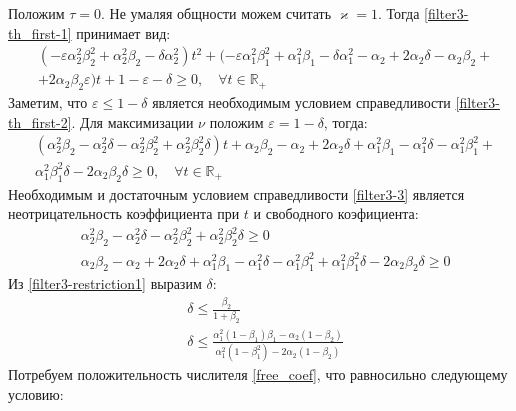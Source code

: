 \documentclass[a4paper,article,14pt]{extarticle}
\begin{document}
Положим $\tau = 0$. Не умаляя общности можем считать $\varkappa = 1$. Тогда \eqref{filter3-th_first-1} принимает вид:
 \begin{equation}\label{filter3-th_first-2}
 \begin{aligned}
&(-\varepsilon\alpha_2^2\beta_2^2 + \alpha_2^2\beta_2 - \delta\alpha_2^2)t^2 + (-\varepsilon\alpha_1^2\beta_1^2 + \alpha_1^2\beta_1 - \delta\alpha_1^2 - \alpha_2 + 2\alpha_2\delta - \alpha_2\beta_2 +\\
&+ 2\alpha_2\beta_2\varepsilon)t + 1 - \varepsilon - \delta \geqslant 0, \quad \forall t \in \mathbb{R_+}
 \end{aligned}
\end{equation}
Заметим, что $\varepsilon \leqslant 1 - \delta$ является необходимым условием справедливости \eqref{filter3-th_first-2}. Для максимизации $\nu$ положим $\varepsilon = 1-\delta$, тогда:
 \begin{equation}\label{filter3-3}
 \begin{aligned}
&(\alpha_2^2\beta_2 - \alpha_2^2\delta - \alpha_2^2\beta_2^2 + \alpha_2^2\beta_2^2\delta)t + \alpha_2\beta_2 - \alpha_2 + 2\alpha_2\delta + \alpha_1^2\beta_1 - \alpha_1^2\delta - \alpha_1^2\beta_1^2 + \\
&\alpha_1^2\beta_1^2\delta - 2\alpha_2\beta_2\delta \geqslant 0, \quad \forall t \in \mathbb{R_+}
 \end{aligned}
\end{equation}
Необходимым и достаточным условием справедливости \eqref{filter3-3} является неотрицательность коэффициента при $t$ и свободного коэфициента:
 \begin{equation}\label{filter3-restriction1}
 \begin{aligned}
&\alpha_2^2\beta_2 - \alpha_2^2\delta - \alpha_2^2\beta_2^2 + \alpha_2^2\beta_2^2\delta \geqslant 0\\ 
&\alpha_2\beta_2 - \alpha_2 + 2\alpha_2\delta + \alpha_1^2\beta_1 - \alpha_1^2\delta - \alpha_1^2\beta_1^2 + \alpha_1^2\beta_1^2\delta - 2\alpha_2\beta_2\delta \geqslant 0
 \end{aligned}
\end{equation}
Из \eqref{filter3-restriction1} выразим $\delta$:
 \begin{align}
&\delta \leqslant \frac{\beta_2}{1+\beta_2} \label{t_coef}\\
&\delta \leqslant \frac{\alpha_1^2(1-\beta_1)\beta_1 - \alpha_2(1-\beta_2)}{\alpha_1^2(1-\beta_1^2) - 2\alpha_2(1-\beta_2)} \label{free_coef}
 \end{align}
 Потребуем положительность числителя \eqref{free_coef}, что равносильно следующему условию:
\end{document}
